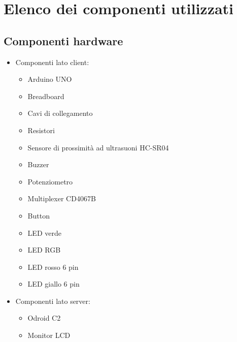 \chapter{Elenco dei componenti utilizzati}

\section{Componenti hardware}
\begin{itemize}
	\item Componenti lato client:
	\begin{itemize}
		\item Arduino UNO
		\item Breadboard
		\item Cavi di collegamento
		\item Resistori
		\item Sensore di prossimità ad ultrasuoni HC-SR04
		\item Buzzer
		\item Potenziometro
		\item Multiplexer CD4067B
		\item Button
		\item LED verde
		\item LED RGB
		\item LED rosso 6 pin
		\item LED giallo 6 pin
	\end{itemize}
\end{itemize}

\begin{itemize}
	\item Componenti lato server:
	\begin{itemize}
		\item Odroid C2
		\item Monitor LCD
	\end{itemize}
\end{itemize}

